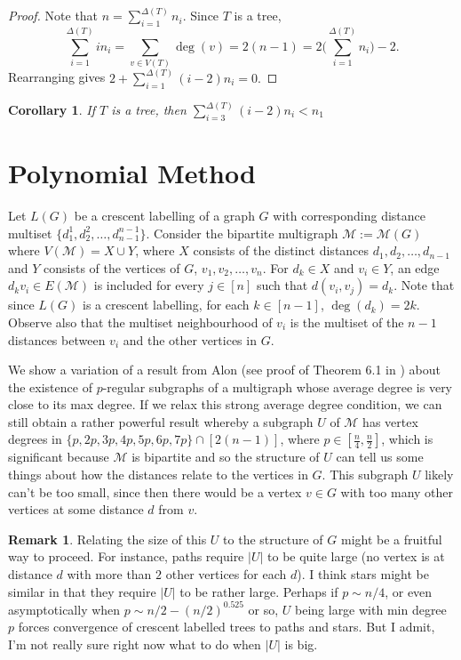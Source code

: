 \documentclass[12]{article}
\newtheorem{cor}[thm]{Corollary}
\theoremstyle{definition}
\newtheorem{rem}[thm]{Remark}
\begin{document}
	\begin{proof}
		Note that $n = \sum_{i=1}^{\Delta(T)}n_i$.  Since $T$ is a tree, 
		$$\sum_{i=1}^{\Delta(T)} in_i  = \sum_{v \in V(T)} \deg(v) = 2(n-1) = 2\biggr(\sum_{i=1}^{\Delta(T)}n_i \biggr) - 2.$$  
		Rearranging gives $2+ \sum_{i=1}^{\Delta(T)} (i-2)n_i = 0.$
	\end{proof}
	
	\begin{cor}
		If $T$ is a tree, then $\sum_{i=3}^{\Delta(T)}(i-2)n_i < n_1$
	\end{cor}
	
	\section{Polynomial Method}
	
	Let $L(G)$ be a crescent labelling of a graph $G$ with corresponding distance multiset $\{d_1^{1},d_2^{2},\ldots,d_{n-1}^{n-1}\}$. Consider the bipartite multigraph $\mathcal{M} := \mathcal{M}(G)$ where $V(\mathcal{M}) = X \cup Y$, where $X$ consists of the distinct distances $d_1,d_2,\ldots,d_{n-1}$ and $Y$ consists of the vertices of $G$, $v_1,v_2,\ldots,v_n$.  For $d_k\in X$ and $v_i \in Y$, an edge $d_kv_i \in E(\mathcal{M})$ is included for every $j \in [n]$ such that $d(v_i,v_j) = d_k$.  Note that since $L(G)$ is a crescent labelling, for each $k \in [n-1]$, $\deg(d_k) = 2k$.  Observe also that the multiset neighbourhood of $v_i$ is the multiset of the $n-1$ distances between $v_i$ and the other vertices in $G$.
		
	We show a variation of a result from Alon (see proof of Theorem 6.1 in \cite{alon}) about the existence of $p$-regular subgraphs of a multigraph whose average degree is very close to its max degree.  If we relax this strong average degree condition, we can still obtain a rather powerful result whereby a subgraph $U$ of $\mathcal{M}$ has vertex degrees in $\{p,2p,3p,4p,5p,6p,7p\} \cap [2(n-1)]$, where $p \in [\tfrac{n}{4},\tfrac{n}{2}]$, which is significant because $\mathcal{M}$ is bipartite and so the structure of $U$ can tell us some things about how the distances relate to the vertices in $G$.  This subgraph $U$ likely can't be too small, since then there would be a vertex $v \in G$ with too many other vertices at some distance $d$ from $v$.  
	
	\begin{rem}
		Relating the size of this $U$ to the structure of $G$ might be a fruitful way to proceed.  For instance, paths require $|U|$ to be quite large (no vertex is at distance $d$ with more than $2$ other vertices for each $d$).  I think stars might be similar in that they require $|U|$ to be rather large.  Perhaps if $p \sim n/4$, or even asymptotically when $p \sim n/2 - (n/2)^{0.525}$ or so, $U$ being large with min degree $p$ forces convergence of crescent labelled trees to paths and stars.  But I admit, I'm not really sure right now what to do when $|U|$ is big.
	\end{rem}
	
\end{document}
